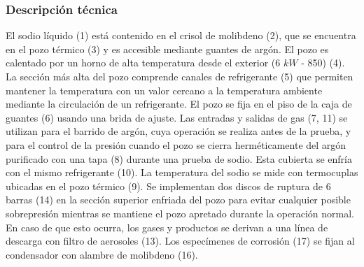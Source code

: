 \documentclass{article}
\begin{document}
\subsubsection*{Descripción técnica}
El sodio líquido (1) está contenido en el crisol de molibdeno (2), que se encuentra en el pozo térmico (3) y es accesible mediante guantes de argón. El pozo es calentado por un horno de alta temperatura desde el exterior (6 $kW$ - 850\celsius) (4). La sección más alta del pozo comprende canales de refrigerante (5) que permiten mantener la temperatura con un valor cercano a la temperatura ambiente mediante la circulación de un refrigerante. El pozo se fija en el piso de la caja de guantes (6) usando una brida de ajuste. Las entradas y salidas de gas (7, 11) se utilizan para el barrido de argón, cuya operación se realiza antes de la prueba, y para el control de la presión cuando el pozo se cierra herméticamente del argón purificado con una tapa (8) durante una prueba de sodio. Esta cubierta se enfría con el mismo refrigerante (10). La temperatura del sodio se mide con termocuplas ubicadas en el pozo térmico (9). Se implementan dos discos de ruptura de 6 barras (14) en la sección superior enfriada del pozo para evitar cualquier posible sobrepresión mientras se mantiene el pozo apretado durante la operación normal. En caso de que esto ocurra, los gases y productos se derivan a una línea de descarga con filtro de aerosoles (13). Los especímenes de corrosión (17) se fijan al condensador con alambre de molibdeno (16).
\end{document}
